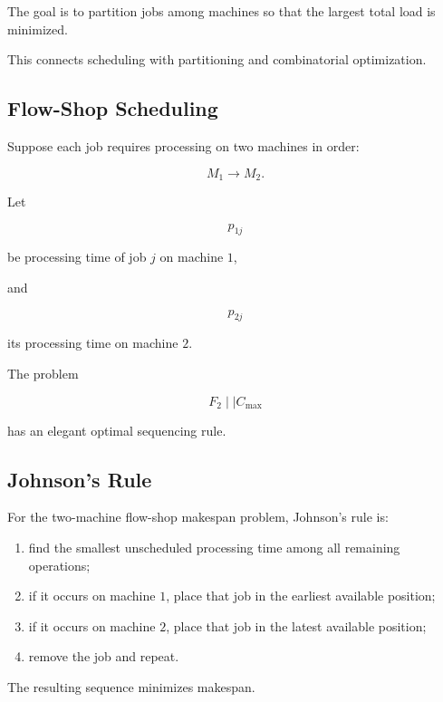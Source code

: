 The goal is to partition jobs among machines so that the largest total
load is minimized.

This connects scheduling with partitioning and combinatorial optimization.

\subsection{Flow-Shop Scheduling}
\label{subsec:flow-shop-details}

Suppose each job requires processing on two machines in order:

\[
M_1
\to
M_2.
\]

Let

\[
p_{1j}
\]

be processing time of job \(j\) on machine \(1\),

and

\[
p_{2j}
\]

its processing time on machine \(2\).

The problem

\[
\boxed{
F_2
\mid
\mid
C_{\max}
}
\]

has an elegant optimal sequencing rule.

\subsection{Johnson's Rule}
\label{subsec:johnsons-rule}

For the two-machine flow-shop makespan problem, Johnson's rule is:

\begin{enumerate}
    \item find the smallest unscheduled processing time among all remaining
          operations;
    \item if it occurs on machine \(1\), place that job in the earliest
          available position;
    \item if it occurs on machine \(2\), place that job in the latest
          available position;
    \item remove the job and repeat.
\end{enumerate}

The resulting sequence minimizes makespan.


